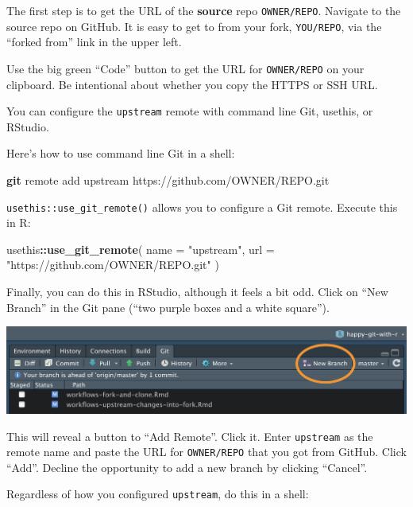 \documentclass[
]{book}
\newenvironment{Shaded}{\begin{snugshade}}{\end{snugshade}}
\newcommand{\AttributeTok}[1]{\textcolor[rgb]{0.13,0.29,0.53}{#1}}
\newcommand{\FunctionTok}[1]{\textcolor[rgb]{0.13,0.29,0.53}{\textbf{#1}}}
\newcommand{\NormalTok}[1]{#1}
\newcommand{\SpecialCharTok}[1]{\textcolor[rgb]{0.81,0.36,0.00}{\textbf{#1}}}
\newcommand{\StringTok}[1]{\textcolor[rgb]{0.31,0.60,0.02}{#1}}
\begin{document}
The first step is to get the URL of the \textbf{source} repo \texttt{OWNER/REPO}.
Navigate to the source repo on GitHub.
It is easy to get to from your fork, \texttt{YOU/REPO}, via the ``forked from'' link in the upper left.

Use the big green ``Code'' button to get the URL for \texttt{OWNER/REPO} on your clipboard.
Be intentional about whether you copy the HTTPS or SSH URL.

You can configure the \texttt{upstream} remote with command line Git, usethis, or RStudio.

Here's how to use command line Git in a shell:

\begin{Shaded}
\begin{Highlighting}[]
\FunctionTok{git}\NormalTok{ remote add upstream https://github.com/OWNER/REPO.git}
\end{Highlighting}
\end{Shaded}

\texttt{usethis::use\_git\_remote()} allows you to configure a Git remote.
Execute this in R:

\begin{Shaded}
\begin{Highlighting}[]
\NormalTok{usethis}\SpecialCharTok{::}\FunctionTok{use\_git\_remote}\NormalTok{(}
  \AttributeTok{name =} \StringTok{"upstream"}\NormalTok{,}
  \AttributeTok{url =} \StringTok{"https://github.com/OWNER/REPO.git"}
\NormalTok{)}
\end{Highlighting}
\end{Shaded}

Finally, you can do this in RStudio, although it feels a bit odd.
Click on ``New Branch'' in the Git pane (``two purple boxes and a white square'').

\begin{center}\includegraphics[width=0.6\linewidth]{img/rstudio-new-branch} \end{center}

This will reveal a button to ``Add Remote''.
Click it.
Enter \texttt{upstream} as the remote name and paste the URL for \texttt{OWNER/REPO} that you got from GitHub.
Click ``Add''.
Decline the opportunity to add a new branch by clicking ``Cancel''.

Regardless of how you configured \texttt{upstream}, do this in a shell:
\end{document}
